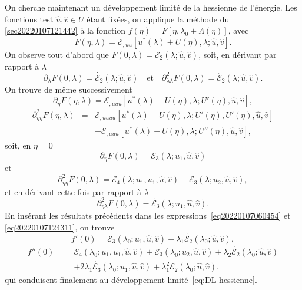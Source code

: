 \documentclass{article}
\newcommand{\nocomma}{}
\newcommand{\nosymbol}{}
\begin{document}
On cherche maintenant un développement limité de la hessienne de
l'énergie. Les fonctions test $\hat{u}, \hat{v} \in U$ étant
fixées, on applique la méthode du
{\textsection}\ref{sec20220107121442} à la fonction $f (\eta) = F [\eta,
\lambda_0 + \Lambda (\eta)]$, avec
\[ F (\eta, \lambda) =\mathcal{E}_{, u \nocomma u} [u^{\ast} (\lambda) + U
   (\eta), \lambda ; \hat{u}, \hat{v}] . \]
On observe tout d'abord que $F (0, \lambda) =\mathcal{E}_2 (\lambda ; \hat{u},
\hat{v})$, soit, en dérivant par rapport à $\lambda$
\[ \partial_{\lambda} F (0, \lambda) = \dot{\mathcal{E}_2} (\lambda ; \hat{u},
   \hat{v}) \quad \text{et} \quad \partial_{\lambda \nocomma \lambda}^2 F (0,
   \lambda) = \ddot{\mathcal{E}_2} (\lambda ; \hat{u}, \hat{v}) . \]
On trouve de même successivement
\[ \partial_{\eta} F (\eta, \lambda) =\mathcal{E}_{, u \nocomma u \nocomma u}
   [u^{\ast} (\lambda) + U (\eta), \lambda ; U' (\eta), \hat{u}, \hat{v}], \]
\begin{eqnarray}
  \partial_{\eta \nocomma \eta}^2 F (\eta, \lambda) & = & \mathcal{E}_{, u
  \nocomma u \nocomma u \nocomma u} [u^{\ast} (\lambda) + U (\eta), \lambda ;
  U' (\eta), U' (\eta), \hat{u}, \hat{v}] \nonumber\\
  &  & \nosymbol +\mathcal{E}_{, u \nocomma u \nocomma u} [u^{\ast} (\lambda)
  + U (\eta), \lambda ; U'' (\eta), \hat{u}, \hat{v}], \nonumber
\end{eqnarray}
soit, en $\eta = 0$
\[ \partial_{\eta} F (0, \lambda) =\mathcal{E}_3 (\lambda ; u_1, \hat{u},
   \hat{v}) \text{} \]
et
\[ \partial_{\eta \nocomma \eta}^2 F (0, \lambda) =\mathcal{E}_4 (\lambda ;
   u_1, u_1, \hat{u}, \hat{v}) +\mathcal{E}_3 (\lambda ; u_2, \hat{u},
   \hat{v}), \]
et en dérivant cette fois par rapport à $\lambda$
\[ \partial_{\eta \nocomma \lambda}^2 F (0, \lambda) = \dot{\mathcal{E}_3}
   (\lambda ; u_1, \hat{u}, \hat{v}) . \]
En insérant les résultats précédents dans les
expressions~\eqref{eq20220107060454} et \eqref{eq20220107124311}, on trouve
\[ f' (0) =\mathcal{E}_3 (\lambda_0 ; u_1, \hat{u}, \hat{v}) + \lambda_1
   \dot{\mathcal{E}_2} (\lambda_0 ; \hat{u}, \hat{v}), \]
\begin{eqnarray}
  f'' (0) & = & \mathcal{E}_4 (\lambda_0 ; u_1, u_1, \hat{u}, \hat{v})
  +\mathcal{E}_3 (\lambda_0 ; u_2, \hat{u}, \hat{v}) + \lambda_2
  \dot{\mathcal{E}_2} (\lambda_0 ; \hat{u}, \hat{v}) \nonumber\\
  &  & \nosymbol \nosymbol + 2 \lambda_1  \dot{\mathcal{E}_3} (\lambda_0 ;
  u_1, \hat{u}, \hat{v}) + \lambda_1^2  \ddot{\mathcal{E}_2} (\lambda_0 ;
  \hat{u}, \hat{v}) . \nonumber
\end{eqnarray}
qui conduisent finalement au développement limité~\eqref{eq:DL
hessienne}.
\end{document}
